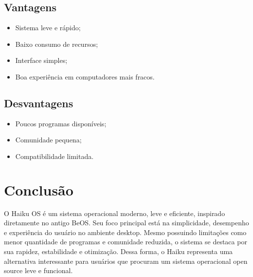 \documentclass[12pt,a4paper]{article}
\begin{document}
\subsection{Vantagens}

\begin{itemize}
    \item Sistema leve e rápido;
    \item Baixo consumo de recursos;
    \item Interface simples;
    \item Boa experiência em computadores mais fracos.
\end{itemize}

\subsection{Desvantagens}

\begin{itemize}
    \item Poucos programas disponíveis;
    \item Comunidade pequena;
    \item Compatibilidade limitada.
\end{itemize}


\section{Conclusão}

O Haiku OS é um sistema operacional moderno, leve e eficiente, inspirado diretamente no antigo BeOS.
Seu foco principal está na simplicidade, desempenho e experiência do usuário no ambiente desktop.
Mesmo possuindo limitações como menor quantidade de programas e comunidade reduzida, o sistema se destaca por sua rapidez, estabilidade e otimização.
Dessa forma, o Haiku representa uma alternativa interessante para usuários que procuram um sistema operacional open source leve e funcional.
\end{document}

